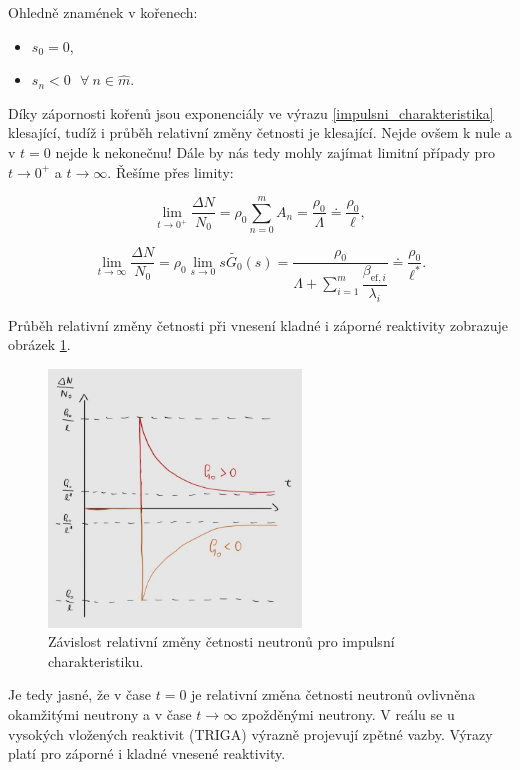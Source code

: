 Ohledně znamének v kořenech:

\begin{itemize}
  \item $s_0 = 0$,
  \item $s_n < 0 \: \: \: \forall \: n \in \widehat{m}$.
\end{itemize}

Díky zápornosti kořenů jsou exponenciály ve výrazu \eqref{impulsni_charakteristika} klesající, tudíž i průběh relativní změny četnosti je klesající. Nejde ovšem k nule a v $t=0$ nejde k nekonečnu! Dále by nás tedy mohly zajímat limitní případy pro $t \rightarrow 0^+$ a $t \rightarrow \infty$. Řešíme přes limity:

$$ \lim_{t \to 0^+} \dfrac{\Delta N}{N_0} = \rho_0 \sum_{n=0}^m A_n = \dfrac{\rho_0}{\Lambda} \doteq \dfrac{\rho_0}{\ell}, $$

$$ \lim_{t \to \infty} \dfrac{\Delta N}{N_0} = \rho_0 \lim_{s \rightarrow 0} s \tilde{G_0}(s) = \dfrac{\rho_0}{\Lambda + \sum_{i = 1}^m \dfrac{\beta_{\text{ef},i}}{\lambda_i}} \doteq \dfrac{\rho_0}{\ell^*}. $$

Průběh relativní změny četnosti při vnesení kladné i záporné reaktivity zobrazuje obrázek \ref{fig_impulsni}.

\begin{figure}[H]
  \centering
  \includegraphics[width=0.6\textwidth]{img/impulsni.jpg}
  \caption{Závislost relativní změny četnosti neutronů pro impulsní charakteristiku.}
  \label{fig_impulsni}
\end{figure}

Je tedy jasné, že v čase $t=0$ je relativní změna četnosti neutronů ovlivněna okamžitými neutrony a v čase $t \rightarrow \infty$ zpožděnými neutrony. V reálu se u vysokých vložených reaktivit (TRIGA) výrazně projevují zpětné vazby. Výrazy platí pro záporné i kladné vnesené reaktivity.

